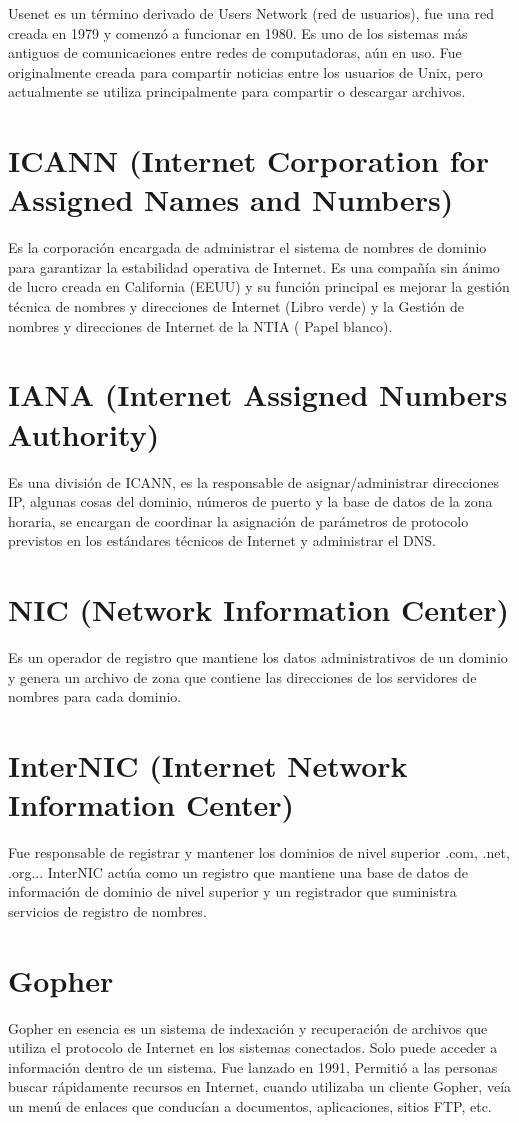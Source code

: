 \documentclass[letterpaper, 10 pt, conference]{ieeeconf}  %
\begin{document}
Usenet es un término derivado de Users Network (red de usuarios), fue una red 
creada en 1979 y comenzó a funcionar en 1980. Es uno de los sistemas más 
antiguos de comunicaciones entre redes de computadoras, aún en uso. Fue 
originalmente creada para compartir noticias entre los usuarios de Unix, pero 
actualmente se utiliza principalmente para compartir o descargar archivos. 

\section{ICANN (Internet Corporation for Assigned Names and Numbers)}

Es la corporación encargada de administrar el sistema de nombres de dominio 
para garantizar la estabilidad operativa de Internet. Es una compañía sin
ánimo de lucro creada en California (EEUU)  y su función principal es mejorar 
la gestión técnica de nombres y direcciones de Internet (Libro verde) y la 
Gestión de nombres y direcciones de Internet de la NTIA ( Papel blanco).

\section{IANA (Internet Assigned Numbers Authority)}

Es una división de ICANN, es la responsable de asignar/administrar direcciones 
IP, algunas cosas del dominio, números de puerto y la base de datos de la zona 
horaria, se encargan de coordinar la asignación de parámetros de protocolo 
previstos en los estándares técnicos de Internet y administrar el DNS.

\section{NIC (Network Information Center)}

Es un operador de registro que mantiene los datos administrativos de un dominio 
y genera un archivo de zona que contiene las direcciones de los servidores de 
nombres para cada dominio.

\section{InterNIC (Internet Network Information Center)}

Fue responsable de registrar y mantener los dominios de nivel superior .com, 
.net, .org... InterNIC actúa como un registro que mantiene una base de datos 
de información de dominio de nivel superior y un registrador que suministra 
servicios de registro de nombres.

\section{Gopher}

Gopher en esencia es un sistema de indexación y recuperación de archivos que 
utiliza el protocolo de Internet en los sistemas conectados. Solo puede 
acceder a información dentro de un sistema. Fue lanzado en 1991, Permitió a las
personas buscar rápidamente recursos en Internet, cuando utilizaba un cliente 
Gopher, veía un menú de enlaces que conducían a documentos, aplicaciones, 
sitios FTP, etc.
\end{document}
